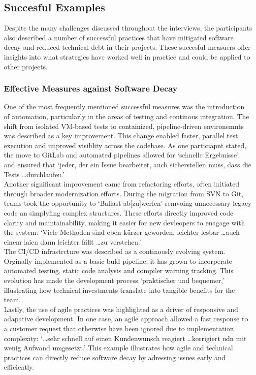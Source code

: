 \subsection{Succesful Examples}
Despite the many challenges discussed throughout the interviews, the participants also described a number of successful practices that have mitigated software decay and reduced technical debt in their projects. These succesful measuers offer insights into what strategies have worked well in practice and could be applied to other projects.

\subsubsection{Effective Measures against Software Decay}
One of the most frequently mentioned successful measures was the introduction of automation, particularly in the areas of testing and continous integration. The shift from isolated VM-based tests to containized, pipeline-driven environemnts was described as a key improvement. This change enabled faster, parallel test execution
and improved visiblity across the codebase. As one particiapnt stated, the move to GitLab and automated pipelines allowed for `schnelle Ergebnisse' and ensured that `jeder, der ein Issue bearbeitet, auch sicherstellen muss, dass die Tests \ldots durchlaufen.'\\

Another significant improvement came from refactoring efforts, often initiated through broader modernization efforts. During the migration from SVN to Git, teams took the opportunity to `Ballast ab[zu]werfen' remvoing unnecessary legacy code an simplyfing complex structures. These efforts directly improved code clarity and maintainability,
making it easier for new devleopers to enagage with the system: `Viele Methoden sind eben kürzer geworden, leichter lesbar \ldots auch einem laien dann leichter fällt \ldots zu verstehen.'\\

The CI/CD infrastrcture was described as a continously evolving system. Orginally implemented as a basic buld pipeline, it has grown to incorperate automated testing, static code analysis and compiler warning tracking. This evolution has made the development process `praktischer und bequemer,' illustrating how technical
investments translate into tangible benefits for the team.\\

Lastly, the use of agile practices was highlighted as a driver of responsive and adapative development. In one case, an agile approach allowed a fast response to a customer request that otherwise have been ignored due to implementation complexity: `\ldots sehr schnell auf einen Kundenwunsch reagiert \ldots korrigiert udn mit wenig Aufwand umgesetzt.'
This example illustrates how agile and technical practices can directly reduce software decay by adressing issues early and efficiently.\\

